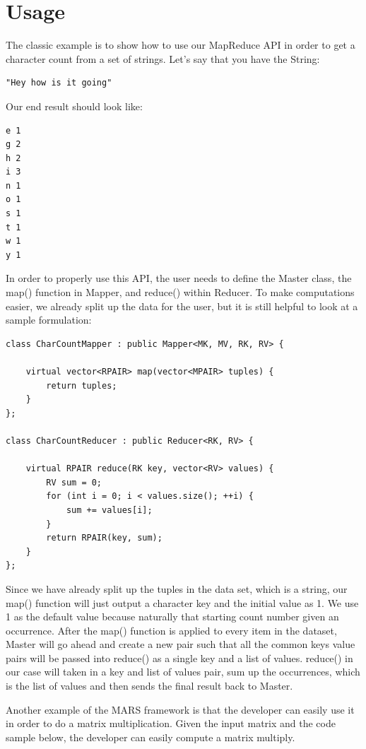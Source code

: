 \documentclass[11pt]{article}
\begin{document}
\section{Usage}
The classic example is to show how to use our MapReduce API in order to get a character count from a set of strings. Let's say that you have the String:
\begin{verbatim}
"Hey how is it going"
\end{verbatim}
Our end result should look like:
\begin{verbatim}
e 1
g 2
h 2
i 3
n 1
o 1
s 1
t 1
w 1
y 1
\end{verbatim}
In order to properly use this API, the user needs to define the Master class, the map() function in Mapper, and reduce() within Reducer. To make computations easier, we already split up the data for the user, but it is still helpful to look at a sample formulation:
\begin{verbatim}
class CharCountMapper : public Mapper<MK, MV, RK, RV> {

    virtual vector<RPAIR> map(vector<MPAIR> tuples) {
        return tuples;
    }
};

class CharCountReducer : public Reducer<RK, RV> {

    virtual RPAIR reduce(RK key, vector<RV> values) {
        RV sum = 0;
        for (int i = 0; i < values.size(); ++i) {
            sum += values[i];
        }
        return RPAIR(key, sum);
    }
};
\end{verbatim}
Since we have already split up the tuples in the data set, which is a string, our map() function will just output a character key and the initial value as 1. We use 1 as the default value because naturally that starting count number given an occurrence. After the map() function is applied to every item in the dataset, Master will go ahead and create a new pair such that all the common keys value pairs will be passed into reduce() as a single key and a list of values. reduce() in our case will taken in a key and list of values pair, sum up the occurrences, which is the list of values and then sends the final result back to Master.

Another example of the MARS framework is that the developer can easily use it in order to do a matrix multiplication. Given the input matrix and the code sample below, the developer can easily compute a matrix multiply.
\end{document}
